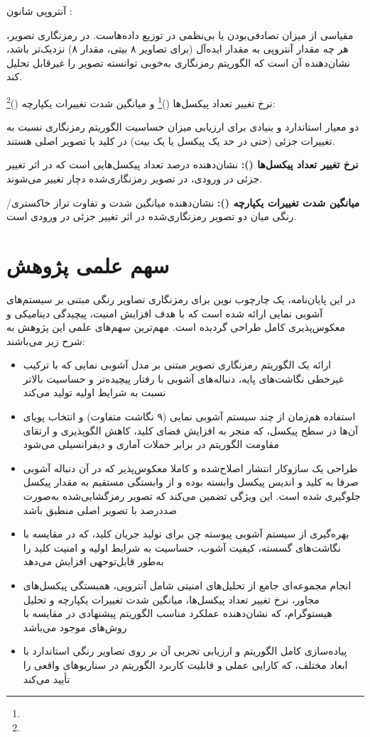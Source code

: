 آنتروپی شانون :

مقیاسی از میزان تصادفی‌بودن یا بی‌نظمی در توزیع داده‌هاست. در رمزنگاری تصویر، هر چه مقدار آنتروپی به مقدار ایده‌آل (برای تصاویر ۸ بیتی، مقدار ۸) نزدیک‌تر باشد، نشان‌دهنده آن است که الگوریتم رمزنگاری به‌خوبی توانسته تصویر را غیرقابل تحلیل کند.

نرخ تغییر تعداد پیکسل‌ها ()\footnote{} و میانگین شدت تغییرات یکپارچه ()\footnote{}:

دو معیار استاندارد و بنیادی برای ارزیابی میزان حساسیت الگوریتم رمزنگاری نسبت به تغییرات جزئی (حتی در حد یک پیکسل یا یک بیت) در کلید یا تصویر اصلی هستند.

\textbf{نرخ تغییر تعداد پیکسل‌ها ():} نشان‌دهنده درصد تعداد پیکسل‌هایی است که در اثر تغییر جزئی در ورودی، در تصویر رمزنگاری‌شده دچار تغییر می‌شوند.

\textbf{میانگین شدت تغییرات یکپارچه ():} نشان‌دهنده میانگین شدت و تفاوت تراز خاکستری/رنگی میان دو تصویر رمزنگاری‌شده در اثر تغییر جزئی در ورودی است.

\section{سهم علمی پژوهش}

در این پایان‌نامه، یک چارچوب نوین برای رمزنگاری تصاویر رنگی مبتنی بر سیستم‌های آشوبی نمایی ارائه شده است که با هدف افزایش امنیت، پیچیدگی دینامیکی و معکوس‌پذیری کامل طراحی گردیده است. مهم‌ترین سهم‌های علمی این پژوهش به شرح زیر می‌باشند:

\begin{itemize}
    \item ارائه یک الگوریتم رمزنگاری تصویر مبتنی بر مدل آشوبی نمایی که با ترکیب غیرخطی نگاشت‌های پایه، دنباله‌های آشوبی با رفتار پیچیده‌تر و حساسیت بالاتر نسبت به شرایط اولیه تولید می‌کند
    \item استفاده هم‌زمان از چند سیستم آشوبی نمایی (۹ نگاشت متفاوت) و انتخاب پویاى آن‌ها در سطح پیکسل، که منجر به افزایش فضای کلید، کاهش الگوپذیری و ارتقای مقاومت الگوریتم در برابر حملات آماری و دیفرانسیلی می‌شود
    \item طراحی یک سازوکار انتشار اصلاح‌شده و کاملا معکوس‌پذیر که در آن دنباله آشوبی صرفا به کلید و اندیس پیکسل وابسته بوده و از وابستگی مستقیم به مقدار پیکسل جلوگیری شده است. این ویژگی تضمین می‌کند که تصویر رمزگشایی‌شده به‌صورت صددرصد با تصویر اصلی منطبق باشد
    \item بهره‌گیری از سیستم آشوبی پیوسته چن برای تولید جریان کلید، که در مقایسه با نگاشت‌های گسسته، کیفیت آشوب، حساسیت به شرایط اولیه و امنیت کلید را به‌طور قابل‌توجهی افزایش می‌دهد
    \item انجام مجموعه‌ای جامع از تحلیل‌های امنیتی شامل آنتروپی، همبستگی پیکسل‌های مجاور، نرخ تغییر تعداد پیکسل‌ها، میانگین شدت تغییرات یکپارچه و تحلیل هیستوگرام، که نشان‌دهنده عملکرد مناسب الگوریتم پیشنهادی در مقایسه با روش‌های موجود می‌باشد
    \item پیاده‌سازی کامل الگوریتم و ارزیابی تجربی آن بر روی تصاویر رنگی استاندارد با ابعاد مختلف، که کارایی عملی و قابلیت کاربرد الگوریتم در سناریوهای واقعی را تأیید می‌کند
\end{itemize}

